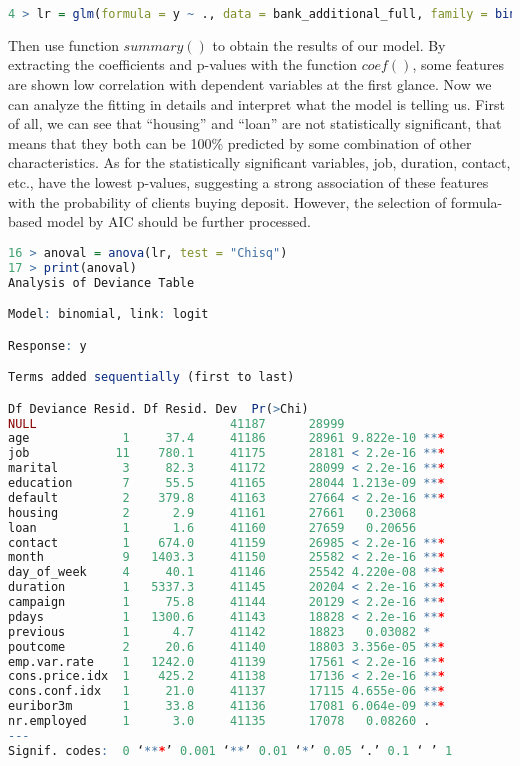 \documentclass[12pt, a4paper, bibliography=totoc, english]{scrartcl}
\begin{document}
\begin{lstlisting}[language = R]
4 > lr = glm(formula = y ~ ., data = bank_additional_full, family = binomial(link = "logit"))
\end{lstlisting}

Then use function $summary()$ to obtain the results of our model. By extracting the coefficients and p-values with the function $coef()$, some features are shown low correlation with dependent variables at the first glance. Now we can analyze the fitting in details and interpret what the model is telling us. First of all, we can see that “housing” and “loan” are not statistically significant, that means that they both can be 100\% predicted by some combination of other characteristics. As for the statistically significant variables, job, duration, contact, etc., have the lowest p-values, suggesting a strong association of these features with the probability of clients buying deposit. However, the selection of formula-based model by AIC should be further processed.

\begin{lstlisting}[language = R]
16 > anoval = anova(lr, test = "Chisq")  
17 > print(anoval)
Analysis of Deviance Table

Model: binomial, link: logit

Response: y

Terms added sequentially (first to last)

Df Deviance Resid. Df Resid. Dev  Pr(>Chi)    
NULL                           41187      28999              
age             1     37.4     41186      28961 9.822e-10 ***
job            11    780.1     41175      28181 < 2.2e-16 ***
marital         3     82.3     41172      28099 < 2.2e-16 ***
education       7     55.5     41165      28044 1.213e-09 ***
default         2    379.8     41163      27664 < 2.2e-16 ***
housing         2      2.9     41161      27661   0.23068    
loan            1      1.6     41160      27659   0.20656    
contact         1    674.0     41159      26985 < 2.2e-16 ***
month           9   1403.3     41150      25582 < 2.2e-16 ***
day_of_week     4     40.1     41146      25542 4.220e-08 ***
duration        1   5337.3     41145      20204 < 2.2e-16 ***
campaign        1     75.8     41144      20129 < 2.2e-16 ***
pdays           1   1300.6     41143      18828 < 2.2e-16 ***
previous        1      4.7     41142      18823   0.03082 *  
poutcome        2     20.6     41140      18803 3.356e-05 ***
emp.var.rate    1   1242.0     41139      17561 < 2.2e-16 ***
cons.price.idx  1    425.2     41138      17136 < 2.2e-16 ***
cons.conf.idx   1     21.0     41137      17115 4.655e-06 ***
euribor3m       1     33.8     41136      17081 6.064e-09 ***
nr.employed     1      3.0     41135      17078   0.08260 .  
---
Signif. codes:  0 ‘***’ 0.001 ‘**’ 0.01 ‘*’ 0.05 ‘.’ 0.1 ‘ ’ 1

\end{lstlisting}
\end{document}
